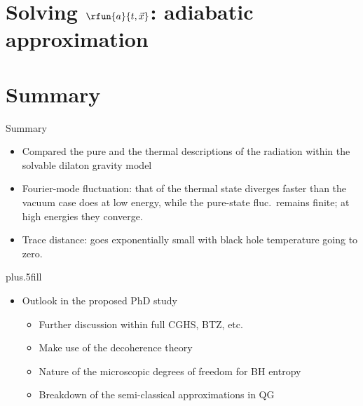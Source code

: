 \documentclass{beamer}
\begin{document}
\section{Solving $\rfun{a}{t,\vec{x}}$: adiabatic approximation}




\section*{Summary}

\begin{frame}{Summary}

\begin{itemize}
\item
Compared the \alert{pure} and the \alert{thermal} descriptions of the
radiation within the solvable dilaton gravity model
\item
Fourier-mode fluctuation: that of the thermal state \alert{diverges} faster
than the vacuum case does at low energy, while the pure-state fluc.\ remains
\alert{finite}; at high energies they \alert{converge}.
\item
Trace distance: goes exponentially \alert{small} with black hole 
\alert{temperature} going to zero.
\end{itemize}
  
  \vskip0pt plus.5fill
  \begin{itemize}
  \item
	Outlook in the proposed PhD study
	\begin{itemize}
	\item Further discussion within full CGHS, BTZ, etc.
	\item Make use of the decoherence theory
	\end{itemize}
	\begin{itemize}
	\item Nature of the microscopic degrees of freedom for BH entropy
	\item Breakdown of the semi-classical approximations in QG
    \end{itemize}
  \end{itemize}
\end{frame}
\end{document}
